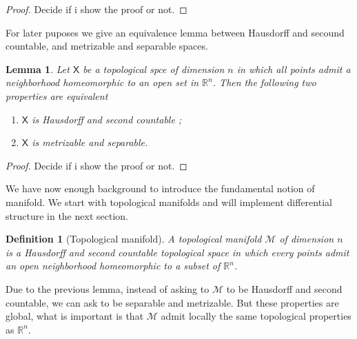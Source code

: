 \documentclass[10pt]{book}
\newcommand{\Mcal}{\mathcal{M}}
\newcommand{\Rbb}{\mathbb{R}}
\newcommand{\Xsf}{\mathsf{X}}
\theoremstyle{break}
\newtheorem{lemma}{Lemma}
\newtheorem{definition}{Definition}
\newtheorem{proof}{Proof}
\begin{document}
\begin{proof}
Decide if i show the proof or not.
\end{proof}


For later puposes we give an equivalence lemma between Hausdorff and secound countable, and metrizable and separable spaces.

\begin{lemma}
Let $\Xsf$ be a topological spce of dimension $n$ in which all points admit a neighborhood homeomorphic to an open set in $\Rbb^n$. Then the following two properties are equivalent
%
\begin{enumerate}
\vspace*{-4pt}
\setlength{\itemsep}{-1pt}
\item $\Xsf$ is Hausdorff and second countable ;
\item $\Xsf$ is metrizable and separable.
\end{enumerate}
%
\end{lemma}


\begin{proof}
Decide if i show the proof or not.
\end{proof}


We have now enough background to introduce the fundamental notion of manifold. We start with topological manifolds and will implement differential structure in the next section.


\begin{definition}[Topological manifold]
A topological manifold $\Mcal$ of dimension $n$ is a Hausdorff and second countable topological space in which every points admit an open neighborhood homeomorphic to a subset of $\Rbb^n$.
\end{definition}

Due to the previous lemma, instead of asking to $\Mcal$ to be Hausdorff and second countable, we can ask to be separable and metrizable. But these properties are global, what is important is that $\Mcal$ admit locally the same topological properties as $\Rbb^n$.\par%
\end{document}
